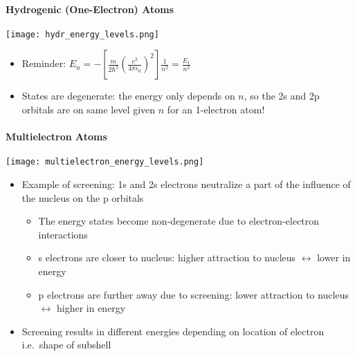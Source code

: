 \paragraph{Hydrogenic (One-Electron) Atoms}


\begin{center}
    \texttt{[image: hydr\_energy\_levels.png]}
\end{center}
\begin{itemize}
    \item Reminder: $E_n = -\left[\frac{m}{2\hbar^2}{\left(\frac{e^2}{4\pi\epsilon_0}\right)}^2\right]\frac{1}{n^2} = \frac{E_1}{n^2}$
    \item States are degenerate: the energy only depends on $n$, so the 2s and 2p orbitals are on same level given $n$ for an 1-electron atom!
\end{itemize}

\paragraph{Multielectron Atoms}


\begin{center}
    \texttt{[image: multielectron\_energy\_levels.png]}
\end{center}
\begin{itemize}
    \item Example of screening: 1s and 2s electrons neutralize a part of the influence of the nucleus on the p orbitals
          \begin{itemize}
              \item The energy states become non-degenerate due to electron-electron interactions
              \item s electrons are closer to nucleus: higher attraction to nucleus $\leftrightarrow$ lower in energy
              \item p electrons are further away due to screening: lower attraction to nucleus $\leftrightarrow$ higher in energy
          \end{itemize}
    \item Screening results in different energies depending on location of electron i.e.\ shape of subshell
\end{itemize}


